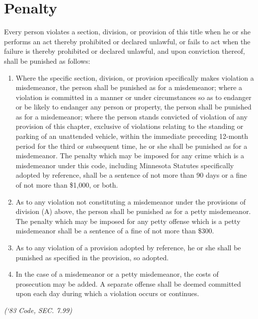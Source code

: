 \section{Penalty}
Every person violates a section, division, or provision of this title when he or she performs an act thereby prohibited or declared unlawful, or fails to act when the failure is thereby prohibited or declared unlawful, and upon conviction thereof, shall be punished as follows:
\begin{enumerate}[{\indent}A)]
    \item Where the specific section, division, or provision specifically makes violation a misdemeanor, the person shall be punished as for a misdemeanor; where a violation is committed in a manner or under circumstances so as to endanger or be likely to endanger any person or property, the person shall be punished as for a misdemeanor; where the person stands convicted of violation of any provision of this chapter, exclusive of violations relating to the standing or parking of an unattended vehicle, within the immediate preceding 12-month period for the third or subsequent time, he or she shall be punished as for a misdemeanor.  The penalty which may be imposed for any crime which is a misdemeanor under this code, including Minnesota Statutes specifically adopted by reference, shall be a sentence of not more than 90 days or a fine of not more than \$1,000, or both.
    \item As to any violation not constituting a misdemeanor under the provisions of division (A) above,  the person shall be punished as for a petty misdemeanor.  The penalty which may be imposed for any petty offense which is a petty misdemeanor shall be a sentence of a fine of not more than \$300.
    \item As to any violation of a provision adopted by reference, he or she shall be punished as specified in the provision, so adopted.
    \item In the case of a misdemeanor or a petty misdemeanor, the costs of prosecution may be added.  A separate offense shall be deemed committed upon each day during which a violation occurs or continues.
\end{enumerate}
\emph{(‘83 Code, SEC. 7.99)}
